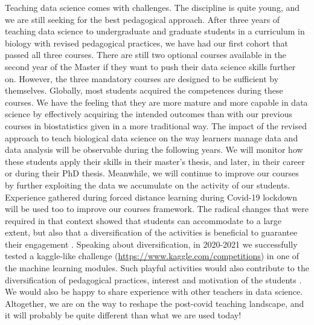 \documentclass{aims}
\theoremstyle{definition}
\begin{document}
Teaching data science comes with challenges. The discipline is quite
young, and we are still seeking for the best pedagogical approach. After
three years of teaching data science to undergraduate and graduate
students in a curriculum in biology with revised pedagogical practices,
we have had our first cohort that passed all three courses. There are
still two optional courses available in the second year of the Master if
they want to push their data science skills further on. However, the
three mandatory courses are designed to be sufficient by themselves.
Globally, most students acquired the competences during these courses.
We have the feeling that they are more mature and more capable in data
science by effectively acquiring the intended outcomes than with our
previous courses in biostatistics given in a more traditional way. The
impact of the revised approach to teach biological data science on the
way learners manage data and data analysis will be observable during the
following years. We will monitor how these students apply their skills
in their master's thesis, and later, in their career or during their PhD
thesis. Meanwhile, we will continue to improve our courses by further
exploiting the data we accumulate on the activity of our students.
Experience gathered during forced distance learning during Covid-19
lockdown will be used too to improve our courses framework. The radical
changes that were required in that context showed that students can
accommodate to a large extent, but also that a diversification of the
activities is beneficial to guarantee their engagement
\cite{Spadafora2018, Young2002}. Speaking about diversification, in
2020-2021 we successfully tested a kaggle-like challenge
(\url{https://www.kaggle.com/competitions}) in one of the machine
learning modules. Such playful activities would also contribute to the
diversification of pedagogical practices, interest and motivation of the
students \cite{Alonso2019}. We would also be happy to share experience
with other teachers in data science. Altogether, we are on the way to
reshape the post-covid teaching landscape, and it will probably be quite
different than what we are used today!

\end{document}
